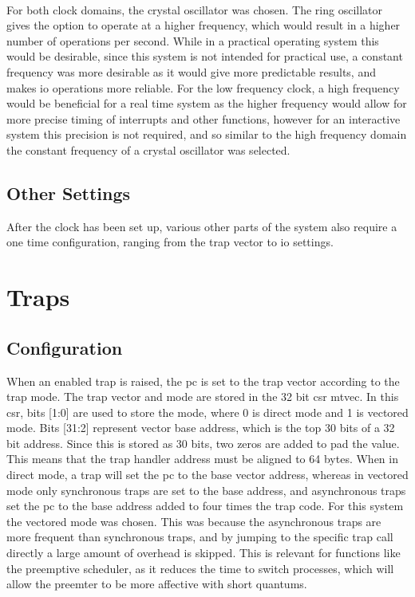 \\
For both clock domains, the crystal oscillator was chosen. The ring oscillator gives the option to operate at a higher frequency, which would result in a higher number of operations per second. While in a practical operating system this would be desirable, since this system is not intended for practical use, a constant frequency was more desirable as it would give more predictable results, and makes \ac{io} operations more reliable. For the low frequency clock, a high frequency would be beneficial for a real time system as the higher frequency would allow for more precise timing of interrupts and other functions, however for an interactive system this precision is not required, and so similar to the high frequency domain the constant frequency of a crystal oscillator was selected.
\subsection{Other Settings}
After the clock has been set up, various other parts of the system also require a one time configuration, ranging from the trap vector to \ac{io} settings.
\section{Traps}
\subsection{Configuration}
When an enabled trap is raised, the pc is set to the trap vector according to the trap mode. The trap vector and mode are stored in the 32 bit csr mtvec. In this csr, bits [1:0] are used to store the mode, where 0 is direct mode and 1 is vectored mode. Bits [31:2] represent vector base address, which is the top 30 bits of a 32 bit address. Since this is stored as 30 bits, two zeros are added to pad the value. This means that the trap handler address must be aligned to 64 bytes. When in direct mode, a trap will set the pc to the base vector address, whereas in vectored mode only synchronous traps are set to the base address, and asynchronous traps set the pc to the base address added to four times the trap code. For this system the vectored mode was chosen. This was because the asynchronous traps are more frequent than synchronous traps, and by jumping to the specific trap call directly a large amount of overhead is skipped. This is relevant for functions like the preemptive scheduler, as it reduces the time to switch processes, which will allow the preemter to be more affective with short quantums.
